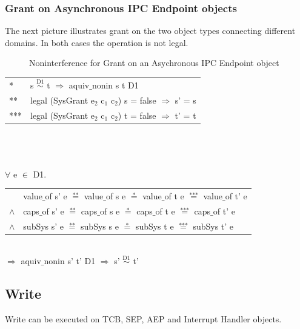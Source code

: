 \documentclass[pdftex,11pt,a4paper,twoside]{article}
\begin{document}
\subsubsection{Grant on Asynchronous IPC Endpoint objects}
The next picture illustrates grant on the two object types connecting different domains. In both cases the operation is not legal. 
\begin{flushleft}
\begin{figure}[H]
\caption{Noninterference for Grant on an Asychronous IPC Endpoint object}
\end{figure}
\end{flushleft}
\begin{tabular}{ll}
* & s $\overset{\text{D1}}{\sim}$ t $\Rightarrow$ aquiv$\_$nonin s t D1	\\ 
** & legal (SysGrant e$_2$ c$_1$ c$_2$) s = false $\Rightarrow$ s' = s \\ 
*** & legal (SysGrant e$_2$ c$_1$ c$_2$) t = false $\Rightarrow$ t' = t
\end{tabular}\\ \\ \\
$\forall$ e $\in$ D1. \\ 
\begin{tabular}{ll}
& value$\_$of s' e $\overset{\text{**}}{=}$ value$\_$of s e $\overset{\text{*}}{=}$ value$\_$of t e $\overset{\text{***}}{=}$ value$\_$of t' e \\
$\wedge$ & caps$\_$of s' e $\overset{\text{**}}{=}$ caps$\_$of s e $\overset{\text{*}}{=}$ caps$\_$of t e $\overset{\text{***}}{=}$ caps$\_$of t' e \\
$\wedge$ & subSys s' e $\overset{\text{**}}{=}$ subSys s e $\overset{\text{*}}{=}$ subSys t e $\overset{\text{***}}{=}$ subSys t' e
\end{tabular} \\
$\Rightarrow$ aquiv$\_$nonin s' t' D1 $\Rightarrow$ s' $\overset{\text{D1}}{\sim}$ t' 
\subsection{Write}\label{Write}
Write can be executed on TCB, SEP, AEP and Interrupt Handler objects.
\end{document}
